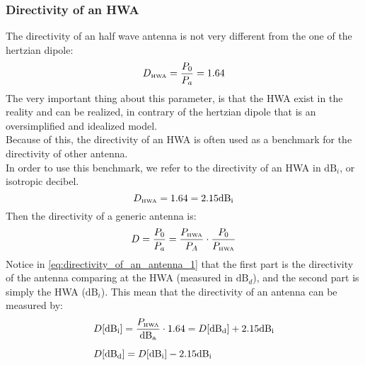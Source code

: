\subsubsection*{Directivity of an HWA}
The directivity of an half wave antenna is not very different from the one of the hertzian dipole:
\begin{equation}
    D_{\text{\tiny{HWA}}}=\frac{P_0}{P_a}=1.64
\end{equation}
The very important thing about this parameter, is that the HWA exist in the reality and can be realized, in contrary of the hertzian dipole that is an oversimplified and idealized model.\\
Because of this, the directivity of an HWA is often used as a benchmark for the directivity of other antenna.\\
In order to use this benchmark, we refer to the directivity of an HWA in $\si{\deci\bel_i}$, or isotropic decibel.
\begin{equation}
    D_{\text{\tiny{HWA}}}=1.64=2.15\si{\deci\bel_i}
\end{equation}
Then the directivity of a generic antenna is:
\begin{equation}\label{eq:directivity_of_an_antenna_1}
    D=\frac{P_0}{P_a}=\frac{P_{\text{\tiny{HWA}}}}{P_A}\cdot\frac{P_0}{P_{\text{\tiny{HWA}}}}
\end{equation}
Notice in \cref{eq:directivity_of_an_antenna_1} that the first part is the directivity of the antenna comparing at the HWA (measured in $\si{\deci\bel_d}$), and the second part is simply the HWA ($\si{\deci\bel_i}$). This mean that the directivity of an antenna can be measured by:
\begin{align}%
    \begin{split}
        &D[\si{\deci\bel_i}]=\frac{P_{\text{\tiny{HWA}}}}{\si{\deci\bel_a}}\cdot1.64=D[\si{\deci\bel_d}]+2.15\si{\deci\bel_i}\\[5pt]
        &D[\si{\deci\bel_d}]=D[\si{\deci\bel_i}]-2.15\si{\deci\bel_i}
    \end{split}
\end{align}
